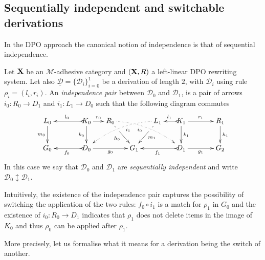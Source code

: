 \documentclass[a4paper,UKenglish,cleveref,pdftex,thm-restate,numberwithinsect,anonymous]{lipics}
\def\R{\mathsf{R}}
\def\X{\textbf {\textup{X}}}
\def\G{\textbf {\textup{G}}}
\newcommand{\dder}[1]{\mathscr{#1}}
\newcommand{\der}[1]{\underline{\dder{#1}}}
\newcommand{\seqind}{\ensuremath{\updownarrow}}
\begin{document}
\subsection{Sequentially independent and switchable derivations }\label{subsec:switch}



In the DPO approach the canonical notion of independence is that of sequential independence.

\begin{definition}
  \label{de:sequential-independence}
  Let $\X$ be an $\mathcal{M}$-adhesive category 
  and $(\X, \R)$ a left-linear DPO rewriting system. 
  Let also
  $\der{D}=\{\dder{D}_i\}_{i=0}^1$ be a derivation of length $2$, with
  $\dder{D}_i$ using rule $\rho_i = (l_i,r_i)$.  An \emph{independence
    pair} between $\dder{D}_0$ and $\dder{D}_1$, is a pair of arrows
  $i_0\colon R_0\to D_1$ and $i_1\colon L_1\to D_0$ such that the
  following diagram commutes
  \[\xymatrix@C=15pt{L_0 \ar[d]_{m_0}&& K_0
      \ar[d]_{k_0}\ar@{>->}[ll]_{l_0} \ar[r]^{r_0} & R_0
      \ar@{.>}@/^.35cm/[drrr]|(.3)\hole_(.4){i_0}
      \ar[dr]|(.3)\hole_{h_0} && L_1 \ar@{.>}@/_.35cm/[dlll]^(.4){i_1}
      \ar[dl]|(.3)\hole^{m_1}& K_1 \ar[d]^{k_1}\ar@{>->}[l]_{l_1}
      \ar[rr]^{r_1} && R_1 \ar[d]^{h_1}\\G_0 && \ar@{>->}[ll]^{f_0}
      D_0 \ar[rr]_{g_0}&& G_1 && \ar@{>->}[ll]^{f_1} D_1
      \ar[rr]_{g_1}&& G_2}\] In this case we say that $\dder{D}_0$ and
  $\dder{D}_1$ are
  \emph{sequentially independent} and write $\dder{D}_0 \seqind \dder{D}_1$.
\end{definition}

Intuitively, the existence of the independence pair
captures the possibility of switching the application of the two rules:
$f_0 \circ i_1$ is a match for $\rho_1$ in $G_0$ and the
existence of $i_0 : R_0 \to D_1$ indicates that $\rho_1$ does not delete
items in the image of $K_0$ and thus $\rho_0$ can be applied after
$\rho_1$.

More precisely, let us formalise what it means for a derivation being the switch of another.

\end{document}
